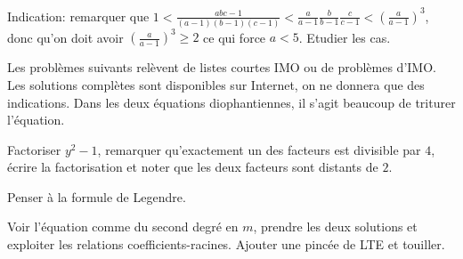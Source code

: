\begin{sol}[28]
		Indication: remarquer que $1 < \frac{abc-1}{(a-1)(b-1)(c-1)} < \frac{a}{a-1}\frac{b}{b-1}\frac{c}{c-1} < (\frac{a}{a-1})^3$, donc qu'on doit avoir $(\frac{a}{a-1})^3 \geq 2$ ce qui force $a < 5$. Etudier les cas.
\end{sol}

Les probl\`emes suivants rel\`event de listes courtes IMO ou de probl\`emes d'IMO. Les solutions compl\`etes sont disponibles sur Internet, on ne donnera que des indications. Dans les deux \'equations diophantiennes, il s'agit beaucoup de triturer l'\'equation. 

\begin{sol}[29]
		Factoriser $y^2-1$, remarquer qu'exactement un des facteurs est divisible par $4$, \'ecrire la factorisation et noter que les deux facteurs sont distants de $2$.
\end{sol}

\begin{sol}[30]
		Penser \`a la formule de Legendre.
\end{sol}

\begin{sol}[31]
		Voir l'\'equation comme du second degr\'e en $m$, prendre les deux solutions et exploiter les relations coefficients-racines. Ajouter une pinc\'ee de LTE et touiller.
\end{sol}
